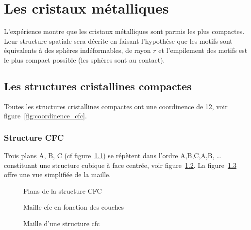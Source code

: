 \chapter{Les cristaux métalliques}
L'expérience montre que les cristaux métalliques sont parmis les plus
compactes. Leur structure spatiale sera décrite en faisant l'hypothèse
que les motifs sont équivalents à des sphères indéformables, de rayon
$r$ et l'empilement des motifs est le plus compact possible (les
sphères sont au contact).

\section{Les structures cristallines compactes}
Toutes les structures cristallines compactes ont une coordinence de
12, voir figure~\ref{fig:coordinence_cfc}.
\subsection{Structure CFC}
Trois plans A, B, C (cf figure~\ref{fig:plans_métal}) se répètent
dans l'ordre A,B,C,A,B, \dots constituant une structure cubique à face
centrée, voir figure~\ref{fig:maille_métal_couches}.
La figure~\ref{fig:maille_cfc} offre une vue simplifiée de la maille.
\begin{figure}
    \centering
    \qquad
    \qquad
    \caption{Plans de la structure CFC}\label{fig:plans_métal}
\end{figure}
\begin{figure}
    \centering
    \qquad
    \caption{Maille cfc
    en fonction des couches}\label{fig:maille_métal_couches}
\end{figure}
\begin{figure}
    \centering
    
    \caption{Maille d'une structure cfc}\label{fig:maille_cfc}
\end{figure}

